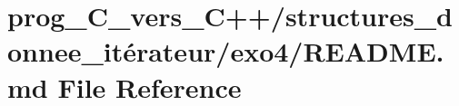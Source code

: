 \hypertarget{prog__C__vers__C_09_09_2structures__donnee__it_xC3_xA9rateur_2exo4_2README_8md}{}\section{prog\+\_\+\+C\+\_\+vers\+\_\+\+C++/structures\+\_\+donnee\+\_\+itérateur/exo4/\+R\+E\+A\+D\+ME.md File Reference}
\label{prog__C__vers__C_09_09_2structures__donnee__it_xC3_xA9rateur_2exo4_2README_8md}

